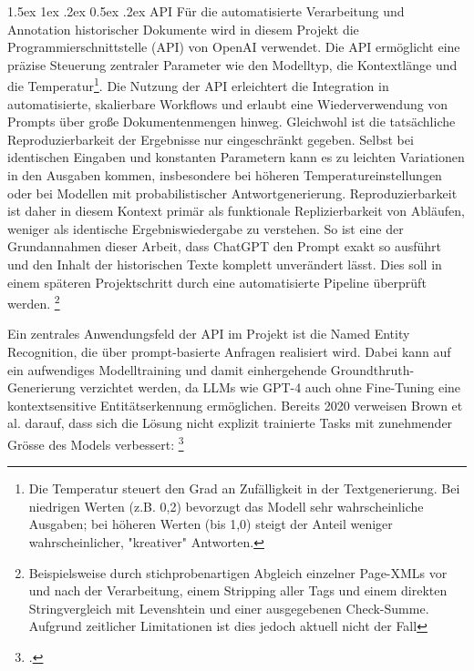 \documentclass[12pt, a4paper, ngerman, bidi=default]{article}
\makeatletter
\let\cite\footcite
\let\oldparagraph\paragraph%
\renewcommand{\paragraph}{
    \@ifstar%
      \xxxParagraphStar%
      \xxxParagraphNoStar%
 }
\newcommand{\xxxParagraphStar}[1]{\oldparagraph*{#1}\mbox{}}
\newcommand{\xxxParagraphNoStar}[1]{\oldparagraph{#1}\mbox{}}
\renewcommand\paragraph{\@startsection{paragraph}{4}{0em}%
  {1.5ex \@plus1ex \@minus.2ex}%
  {0.5ex \@plus.2ex}%
  {\normalfont\normalsize\bfseries\itshape}}
\makeatother
\begin{document}
\paragraph{API}
Für die automatisierte Verarbeitung und Annotation historischer Dokumente wird in diesem Projekt die Programmierschnittstelle (API) von OpenAI verwendet. Die API ermöglicht eine präzise Steuerung zentraler Parameter wie den Modelltyp, die Kontextlänge und die Temperatur\footnote{Die Temperatur steuert den Grad an Zufälligkeit in der Textgenerierung. Bei niedrigen Werten (z.B. 0,2) bevorzugt das Modell sehr wahrscheinliche Ausgaben; bei höheren Werten (bis 1{,}0) steigt der Anteil weniger wahrscheinlicher, "kreativer" Antworten.}.
 Die Nutzung der API erleichtert die Integration in automatisierte, skalierbare Workflows und erlaubt eine Wiederverwendung von Prompts über große Dokumentenmengen hinweg. Gleichwohl ist die tatsächliche Reproduzierbarkeit der Ergebnisse nur eingeschränkt gegeben. Selbst bei identischen Eingaben und konstanten Parametern kann es zu leichten Variationen in den Ausgaben kommen, insbesondere bei höheren Temperatureinstellungen oder bei Modellen mit probabilistischer Antwortgenerierung. Reproduzierbarkeit ist daher in diesem Kontext primär als funktionale Replizierbarkeit von Abläufen, weniger als identische Ergebniswiedergabe zu verstehen. So ist eine der Grundannahmen dieser Arbeit, dass ChatGPT den Prompt exakt so ausführt und den Inhalt der historischen Texte komplett unverändert lässt. Dies soll in einem späteren Projektschritt durch eine automatisierte Pipeline überprüft werden. \footnote{Beispielsweise durch stichprobenartigen Abgleich einzelner Page-XMLs vor und nach der Verarbeitung, einem Stripping aller Tags und einem direkten Stringvergleich mit Levenshtein und einer ausgegebenen Check-Summe. Aufgrund zeitlicher Limitationen ist dies jedoch aktuell nicht der Fall}
 
 Ein zentrales Anwendungsfeld der API im Projekt ist die Named Entity Recognition, die über prompt-basierte Anfragen realisiert wird. Dabei kann auf ein aufwendiges Modelltraining und damit einhergehende Groundthruth-Generierung verzichtet werden, da LLMs wie GPT-4 auch ohne Fine-Tuning eine kontextsensitive Entitätserkennung ermöglichen. Bereits 2020 verweisen Brown et al. darauf, dass sich die Lösung nicht explizit trainierte Tasks mit zunehmender Grösse des Models verbessert: \small\textit{}\cite[vgl.][S.4]{brown_language_2020} 
\end{document}

